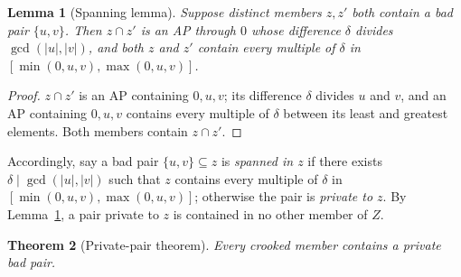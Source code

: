 \documentclass[11pt]{article}
\newtheorem{theorem}{Theorem}[section]
\newtheorem{lemma}[theorem]{Lemma}
\theoremstyle{definition}
\begin{document}
\begin{lemma}[Spanning lemma]\label{lem:span}
Suppose distinct members $z,z'$ both contain a bad pair $\{u,v\}$. Then $z\cap z'$ is an AP through $0$ whose difference $\delta$ divides $\gcd(|u|,|v|)$, and both $z$ and $z'$ contain every multiple of $\delta$ in $[\min(0,u,v),\max(0,u,v)]$.
\end{lemma}

\begin{proof}
$z\cap z'$ is an AP containing $0,u,v$; its difference $\delta$ divides $u$ and $v$, and an AP containing $0,u,v$ contains every multiple of $\delta$ between its least and greatest elements. Both members contain $z\cap z'$.
\end{proof}

Accordingly, say a bad pair $\{u,v\}\subseteq z$ is \emph{spanned in $z$} if there exists $\delta\mid\gcd(|u|,|v|)$ such that $z$ contains every multiple of $\delta$ in $[\min(0,u,v),\max(0,u,v)]$; otherwise the pair is \emph{private to $z$}. By Lemma~\ref{lem:span}, a pair private to $z$ is contained in no other member of $Z$.

\begin{theorem}[Private-pair theorem]\label{thm:private}
Every crooked member contains a private bad pair.
\end{theorem}
\end{document}
